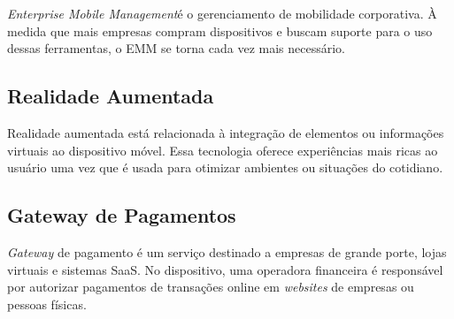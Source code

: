 \textit{Enterprise Mobile Management}é o gerenciamento de mobilidade corporativa. À medida que mais empresas compram dispositivos e buscam suporte para o uso dessas ferramentas, o EMM se torna cada vez mais necessário.

\subsection{Realidade Aumentada}

Realidade aumentada está relacionada à integração de elementos ou informações virtuais ao dispositivo móvel. Essa tecnologia oferece experiências mais ricas ao usuário uma vez que é usada para otimizar ambientes ou situações do cotidiano.

\subsection{Gateway de Pagamentos}

\textit{Gateway} de pagamento é um serviço destinado a empresas de grande porte, lojas virtuais e sistemas SaaS. No dispositivo, uma operadora financeira é responsável por autorizar pagamentos de transações online em \textit{websites} de empresas ou pessoas físicas.


\nocite{geek}
\nocite{css3}
\nocite{devweb}
\nocite{queconceito}
\nocite{metodologia}
